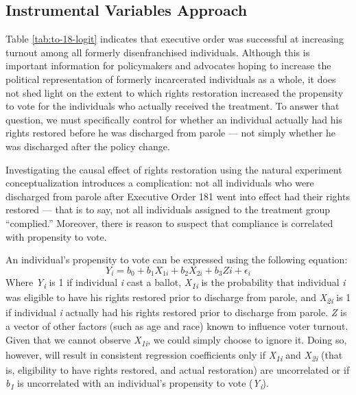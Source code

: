 \documentclass[12pt,]{article}
\begin{document}
\hypertarget{instrumental-variables-approach}{%
\subsection*{Instrumental Variables Approach}\label{instrumental-variables-approach}}

Table \ref{tab:to-18-logit} indicates that executive order was successful at increasing turnout among all formerly disenfranchised individuals. Although this is important information for policymakers and advocates hoping to increase the political representation of formerly incarcerated individuals as a whole, it does not shed light on the extent to which rights restoration increased the propensity to vote for the individuals who actually received the treatment. To answer that question, we must specifically control for whether an individual actually had his rights restored before he was discharged from parole --- not simply whether he was discharged after the policy change.

Investigating the causal effect of rights restoration using the natural experiment conceptualization introduces a complication: not all individuals who were discharged from parole after Executive Order 181 went into effect had their rights restored --- that is to say, not all individuals assigned to the treatment group ``complied.'' Moreover, there is reason to suspect that compliance is correlated with propensity to vote.

An individual's propensity to vote can be expressed using the following equation:
\[ Y_i =  b_0 + b_{1}X_{1i} + b_{2}X_{2i} + b_{3}Z{i}+ \epsilon_{i} \]
Where \emph{Y\textsubscript{i}} is 1 if individual \emph{i} cast a ballot, \emph{X\textsubscript{1i}} is the probability that individual \emph{i} was eligible to have his rights restored prior to discharge from parole, and \emph{X\textsubscript{2i}} is 1 if individual \emph{i} actually had his rights restored prior to discharge from parole. \emph{Z} is a vector of other factors (such as age and race) known to influence voter turnout. Given that we cannot observe \emph{X\textsubscript{1i}}, we could simply choose to ignore it. Doing so, however, will result in consistent regression coefficients only if \emph{X\textsubscript{1i}} and \emph{X\textsubscript{2i}} (that is, eligibility to have rights restored, and actual restoration) are uncorrelated or if \emph{b\textsubscript{1}} is uncorrelated with an individual's propensity to vote (\emph{Y\textsubscript{i}}).
\end{document}
